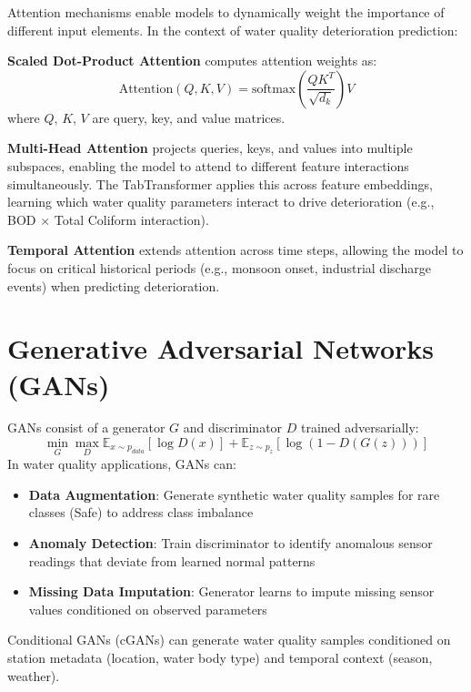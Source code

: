 \documentclass[12pt,a4paper]{report}
\numberwithin{table}{chapter}
\numberwithin{figure}{chapter}
\begin{document}
Attention mechanisms enable models to dynamically weight the importance of different
input elements. In the context of water quality deterioration prediction:

\textbf{Scaled Dot-Product Attention} computes attention weights as:
\begin{equation}
  \text{Attention}(Q,K,V) = \text{softmax}\left(\frac{QK^T}{\sqrt{d_k}}\right)V
\end{equation}
where $Q$, $K$, $V$ are query, key, and value matrices.

\textbf{Multi-Head Attention} projects queries, keys, and values into multiple
subspaces, enabling the model to attend to different feature interactions
simultaneously. The TabTransformer applies this across feature embeddings, learning
which water quality parameters interact to drive deterioration (e.g., BOD $\times$
Total Coliform interaction).

\textbf{Temporal Attention} extends attention across time steps, allowing the model
to focus on critical historical periods (e.g., monsoon onset, industrial discharge
events) when predicting deterioration.

\section{Generative Adversarial Networks (GANs)}

GANs consist of a generator $G$ and discriminator $D$ trained adversarially:
\begin{equation}
  \min_G \max_D \mathbb{E}_{x \sim p_{data}}[\log D(x)] + \mathbb{E}_{z \sim p_z}[\log(1-D(G(z)))]
\end{equation}
In water quality applications, GANs can:
\begin{itemize}
  \item \textbf{Data Augmentation}: Generate synthetic water quality samples for rare
    classes (Safe) to address class imbalance
  \item \textbf{Anomaly Detection}: Train discriminator to identify anomalous sensor
    readings that deviate from learned normal patterns
  \item \textbf{Missing Data Imputation}: Generator learns to impute missing sensor
    values conditioned on observed parameters
\end{itemize}
Conditional GANs (cGANs) can generate water quality samples conditioned on station
metadata (location, water body type) and temporal context (season, weather).
\end{document}
